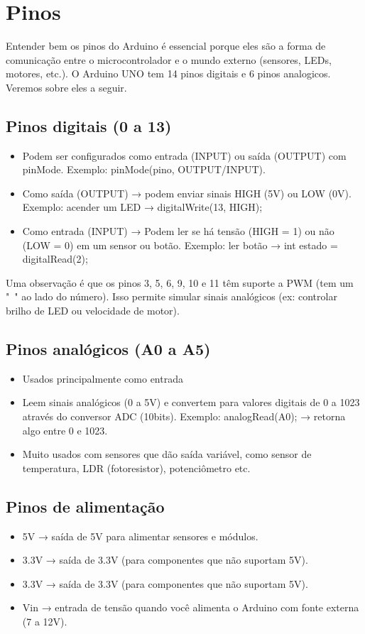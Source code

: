 \documentclass{report}
\begin{document}
	\section{Pinos}
	
	Entender bem os pinos do Arduino é essencial porque eles são a forma de comunicação entre o microcontrolador e o mundo externo (sensores, LEDs, motores, etc.). O Arduino UNO tem 14 pinos digitais e 6 pinos analogicos. Veremos sobre eles a seguir.
	\subsection{Pinos digitais (0 a 13)}
	\begin{itemize}
		\item Podem ser configurados como entrada (INPUT) ou saída (OUTPUT) com pinMode. Exemplo: pinMode(pino, OUTPUT/INPUT).
		\item Como saída (OUTPUT) → podem enviar sinais HIGH (5V) ou LOW (0V). Exemplo: acender um LED → digitalWrite(13, HIGH);
		\item  Como entrada (INPUT) → Podem ler se há tensão (HIGH = 1) ou não (LOW = 0) em um sensor ou botão. Exemplo: ler botão → int estado = digitalRead(2);
	\end{itemize}
	
	Uma observação é que os pinos 3, 5, 6, 9, 10 e 11 têm suporte a PWM (tem um "~" ao lado do número). Isso permite simular sinais analógicos (ex: controlar brilho de LED ou velocidade de motor).
	
	\subsection{Pinos analógicos (A0 a A5)}
	\begin{itemize}
		\item Usados principalmente como entrada
		\item Leem sinais analógicos (0 a 5V) e convertem para valores digitais de 0 a 1023 através do conversor ADC (10bits). Exemplo: analogRead(A0); → retorna algo entre 0 e 1023.
		\item Muito usados com sensores que dão saída variável, como sensor de temperatura, LDR (fotoresistor), potenciômetro etc.
	
	\end{itemize}
	
	\subsection{Pinos de alimentação}
	\begin{itemize}
		\item 5V → saída de 5V para alimentar sensores e módulos.
		\item 3.3V → saída de 3.3V (para componentes que não suportam 5V).
		\item 3.3V → saída de 3.3V (para componentes que não suportam 5V).
		\item Vin → entrada de tensão quando você alimenta o Arduino com fonte externa (7 a 12V).
	\end{itemize}
	
\end{document}
